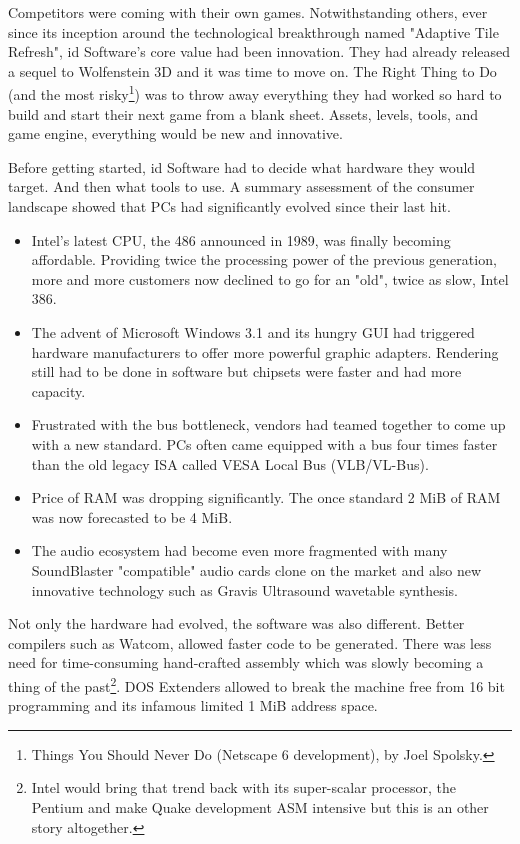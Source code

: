 Competitors were coming with their own games. Notwithstanding others, ever since its inception around the technological breakthrough named "Adaptive Tile Refresh", id Software's core value had been innovation. They had already released a sequel to Wolfenstein 3D and it was time to move on. The Right Thing to Do (and the most risky\footnote{Things You Should Never Do (Netscape 6 development), by Joel Spolsky.}) was to throw away everything they had worked so hard to build and start their next game from a blank sheet. Assets, levels, tools, and game engine, everything would be new and innovative.\\
\par
Before getting started, id Software had to decide what hardware they would target. And then what tools to use. A summary assessment of the consumer landscape showed that PCs had significantly evolved since their last hit.
\begin{itemize}
\item Intel's latest CPU, the 486 announced in 1989, was finally becoming affordable. Providing twice the processing power of the previous generation, more and more customers now declined to go for an "old", twice as slow, Intel 386. 
\item The advent of Microsoft Windows 3.1 and its hungry GUI had triggered hardware manufacturers to offer more powerful graphic adapters. Rendering  still had to be done in software but chipsets were faster and had more capacity.
\item Frustrated with the bus bottleneck, vendors had teamed together to come up with a new standard. PCs often came equipped with a bus four times faster than the old legacy ISA called VESA Local Bus (VLB/VL-Bus). 
\item Price of RAM was dropping significantly. The once standard 2 MiB of RAM was now forecasted to be 4 MiB. 
\item The audio ecosystem had become even more fragmented with many SoundBlaster "compatible" audio cards clone on the market and also new innovative technology such as Gravis Ultrasound wavetable synthesis.\\
\end{itemize}
 \par 
 Not only the hardware had evolved, the software was also different. Better compilers such as Watcom, allowed faster code to be generated. There was less need for time-consuming hand-crafted assembly which was slowly becoming a thing of the past\footnote{Intel would bring that trend back with its super-scalar processor, the Pentium and make Quake development ASM intensive but this is an other story altogether.}. DOS Extenders allowed to break the machine free from 16 bit programming and its infamous limited 1 MiB address space.\\

